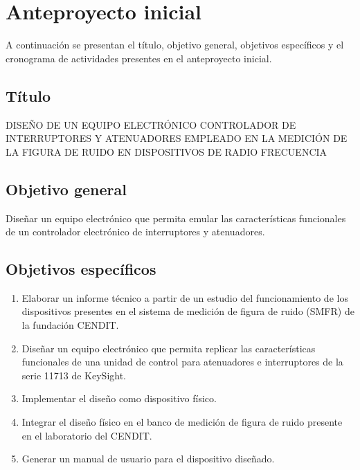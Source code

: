 \documentclass[paper=letter,oneside,fontsize=10pt]{article}
\begin{document}
	
	\section{Anteproyecto inicial}
	
	A continuación se presentan el título, objetivo general, objetivos específicos y el cronograma de actividades presentes en el anteproyecto inicial.
	
	\subsection{Título}
	
	\begin{minipage}{0.95\textwidth}
		\centering
		DISEÑO DE UN EQUIPO ELECTRÓNICO CONTROLADOR DE INTERRUPTORES Y ATENUADORES EMPLEADO EN LA MEDICIÓN DE LA FIGURA DE RUIDO EN DISPOSITIVOS DE RADIO FRECUENCIA
	\end{minipage}

	\subsection{Objetivo general}

	\begin{minipage}{0.95\textwidth}
		Diseñar un equipo electrónico que permita emular las características funcionales de un controlador electrónico de interruptores y atenuadores.
	\end{minipage}

	\subsection{Objetivos específicos}

	\begin{enumerate}
		\item Elaborar un informe técnico a partir de un estudio del funcionamiento de los dispositivos presentes en el sistema de medición de figura de ruido (SMFR) de la fundación CENDIT.
		
		\item Diseñar un equipo electrónico que permita replicar las características funcionales de	una unidad de control para atenuadores e interruptores de la serie 11713 de KeySight.
		
		\item Implementar el diseño como dispositivo físico.
		
		\item Integrar el diseño físico en el banco de medición de figura de ruido presente en el laboratorio del CENDIT.
		
		\item Generar un manual de usuario para el dispositivo diseñado.
	\end{enumerate}	
\end{document}
